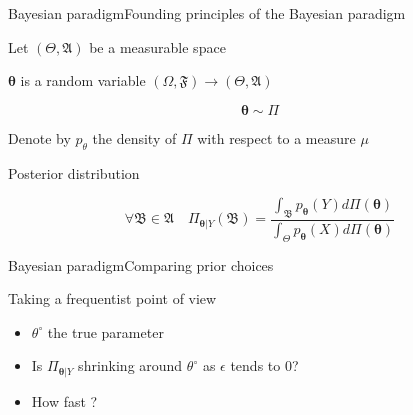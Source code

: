 \documentclass[10pt]{beamer}
\begin{document}
\begin{frame}{Bayesian paradigm}{Founding principles of the Bayesian paradigm}

Let $(\Theta, \mathfrak{A})$ be a measurable space

$\boldsymbol{\theta}$ is a random variable $(\Omega, \mathfrak{F}) \rightarrow (\Theta, \mathfrak{A})$

\[ \boldsymbol{\theta} \sim \Pi \]

\bigskip

Denote by $p_{\theta}$ the density of $\Pi$ with respect to a measure $\mu$

Posterior distribution

\[ \forall \mathfrak{B} \in \mathfrak{A} \quad \Pi_{\boldsymbol{\theta}\vert Y}(\mathfrak{B}) = \frac{\int_{\mathfrak{B}} p_{\boldsymbol{\theta}}(Y)d\Pi(\boldsymbol{\theta})}{\int_{\Theta} p_{\boldsymbol{\theta}}(X)d\Pi(\boldsymbol{\theta})}\]

\end{frame}

\begin{frame}{Bayesian paradigm}{Comparing prior choices}

Taking a frequentist point of view
\begin{itemize}
\item $\theta^{\circ}$ the true parameter
\item Is $\Pi_{\boldsymbol{\theta}\vert Y}$ shrinking around $\theta^{\circ}$ as $\epsilon$ tends to $0$?
\item How fast ?

\end{itemize}

\end{frame}
\end{document}
